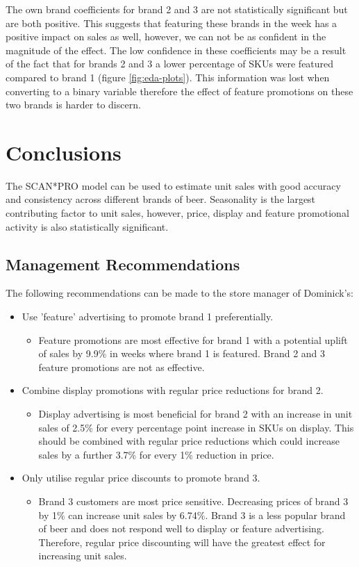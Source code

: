 \documentclass[a4paper,11pt]{article}
\begin{document}
The own brand coefficients for brand 2 and 3 are not statistically significant but are both positive. This suggests that featuring these brands in the week has a positive impact on sales as well, however, we can not be as confident in the magnitude of the effect. The low confidence in these coefficients may be a result of the fact that for brands 2 and 3 a lower percentage of SKUs were featured compared to brand 1 (figure \ref{fig:eda-plots}). This information was lost when converting to a binary variable therefore the effect of feature promotions on these two brands is harder to discern.


\section{Conclusions}

The SCAN*PRO model can be used to estimate unit sales with good accuracy and consistency across different brands of beer. Seasonality is the largest contributing factor to unit sales, however, price, display and feature promotional activity is also statistically significant. 

\subsection{Management Recommendations}
The following recommendations can be made to the store manager of Dominick's:
\begin{itemize}
    \item Use 'feature' advertising to promote brand 1 preferentially.
    \begin{itemize}
        \item Feature promotions are most effective for brand 1 with a potential uplift of sales by 9.9\% in weeks where brand 1 is featured. Brand 2 and 3 feature promotions are not as effective.
    \end{itemize}
    \item Combine display promotions with regular price reductions for brand 2.
    \begin{itemize}
        \item Display advertising is most beneficial for brand 2 with an increase in unit sales of 2.5\% for every percentage point increase in SKUs on display. This should be combined with regular price reductions which could increase sales by a further 3.7\% for every 1\% reduction in price.
    \end{itemize}
    \item Only utilise regular price discounts to promote brand 3.
    \begin{itemize}
        \item Brand 3 customers are most price sensitive. Decreasing prices of brand 3 by 1\% can increase unit sales by 6.74\%. Brand 3 is a less popular brand of beer and does not respond well to display or feature advertising. Therefore, regular price discounting will have the greatest effect for increasing unit sales. 
    \end{itemize}
    

\end{itemize}
\end{document}
